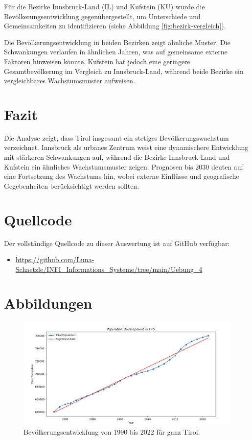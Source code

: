\documentclass[a4paper,12pt]{article}
\begin{document}
Für die Bezirke Innsbruck-Land (IL) und Kufstein (KU) wurde die Bevölkerungsentwicklung gegenübergestellt, um Unterschiede und Gemeinsamkeiten zu identifizieren (siehe Abbildung \ref{fig:bezirk-vergleich}).

Die Bevölkerungsentwicklung in beiden Bezirken zeigt ähnliche Muster. Die Schwankungen verlaufen in ähnlichen Jahren, was auf gemeinsame externe Faktoren hinweisen könnte. Kufstein hat jedoch eine geringere Gesamtbevölkerung im Vergleich zu Innsbruck-Land, während beide Bezirke ein vergleichbares Wachstumsmuster aufweisen.

\section{Fazit}

Die Analyse zeigt, dass Tirol insgesamt ein stetiges Bevölkerungswachstum verzeichnet. Innsbruck als urbanes Zentrum weist eine dynamischere Entwicklung mit stärkeren Schwankungen auf, während die Bezirke Innsbruck-Land und Kufstein ein ähnliches Wachstumsmuster zeigen. Prognosen bis 2030 deuten auf eine Fortsetzung des Wachstums hin, wobei externe Einflüsse und geografische Gegebenheiten berücksichtigt werden sollten.

\section{Quellcode}

Der vollständige Quellcode zu dieser Auswertung ist auf GitHub verfügbar:
\begin{itemize}
    \item \url{https://github.com/Luna-Schaetzle/INFI_Informations_Systeme/tree/main/Uebung_4}
\end{itemize}

\newpage
\section{Abbildungen}

\begin{figure}[h]
    \centering
    \includegraphics[width=\textwidth]{image.png}
    \caption{Bevölkerungsentwicklung von 1990 bis 2022 für ganz Tirol.}
    \label{fig:tirol-entw}
\end{figure}
\end{document}

